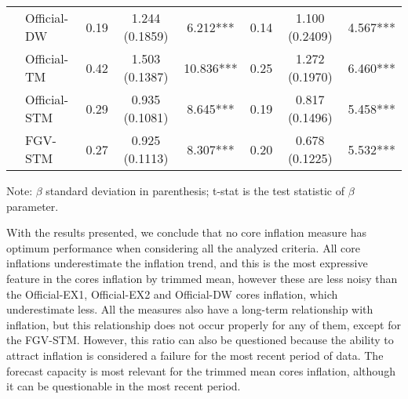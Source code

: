 \documentclass[10pt]{article}
\begin{document}
\begin{table}[h]
\begin{threeparttable}
\begin{tabular}{@{}cl|ccc|ccc@{}}
                                   & \multicolumn{1}{l|}{Official-DW}  & 0.19                 & 1.244 (0.1859)   & 6.212***          & 0.14                 & 1.100 (0.2409)   & 4.567***        \\
                                   & \multicolumn{1}{l|}{Official-TM}  & 0.42                 & 1.503 (0.1387)   & 10.836***         & 0.25                 & 1.272 (0.1970)   & 6.460***       \\
                                   & \multicolumn{1}{l|}{Official-STM} & 0.29                 & 0.935 (0.1081)   & 8.645***          & 0.19                 & 0.817 (0.1496)   & 5.458***        \\
                                   & \multicolumn{1}{l|}{FGV-STM}      & 0.27                 & 0.925 (0.1113)   & 8.307***          & 0.20                 & 0.678 (0.1225)   & 5.532***        \\ \bottomrule
\end{tabular}
\begin{tablenotes}
\item \scriptsize{Note: $\beta$ standard deviation in parenthesis; t-stat is the test statistic of $\beta$ parameter.}
\end{tablenotes}
\end{threeparttable}
\end{table}


With the results presented, we conclude that no core inflation measure has optimum performance when considering all the analyzed criteria. All core inflations underestimate the inflation trend, and this is the most expressive feature in the cores inflation by trimmed mean, however these are less noisy than the Official-EX1, Official-EX2 and Official-DW cores inflation, which underestimate less. All the measures also have a long-term relationship with inflation, but this relationship does not occur properly for any of them, except for the FGV-STM. However, this ratio can also be questioned because the ability to attract inflation is considered a failure for the most recent period of data. The forecast capacity is most relevant for the trimmed mean cores inflation, although it can be questionable in the most recent period.

\end{document}
